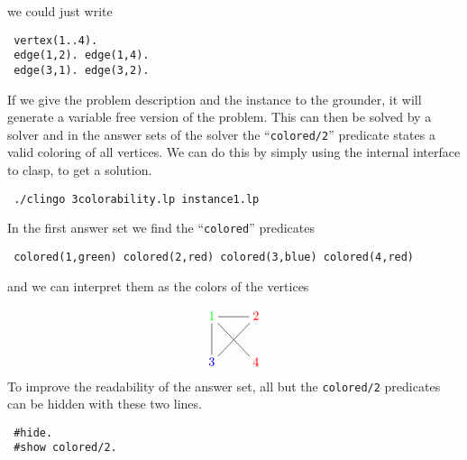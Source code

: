 \documentclass[a4paper,10pt]{article}
\begin{document}
we could just write
\begin{verbatim}
 vertex(1..4).
 edge(1,2). edge(1,4).
 edge(3,1). edge(3,2).
\end{verbatim}

If we give the problem description and the instance to the grounder, it will generate a variable free version of the problem. This can then be solved by a solver and in the answer sets of the solver the ``\texttt{colored/2}'' predicate states a valid coloring of all vertices.
We can do this by simply using the internal interface to clasp, to get a solution.
\begin{verbatim}
 ./clingo 3colorability.lp instance1.lp
\end{verbatim}
In the first answer set we find the ``\texttt{colored}'' predicates
\begin{verbatim}
 colored(1,green) colored(2,red) colored(3,blue) colored(4,red)
\end{verbatim}
and we can interpret them as the colors of the vertices
 
\[
 \xymatrix{\color{green}1\ar@{-}[dr]\ar@{-}[d]\ar@{-}[r]&\color{red}2\ar@{-}[dl]\\
           \color{blue}3&\color{red}4}
\]
To improve the readability of the answer set, all but the \texttt{colored/2} predicates can be hidden with these two lines.
\begin{verbatim}
 #hide.
 #show colored/2.
\end{verbatim}
\end{document}
